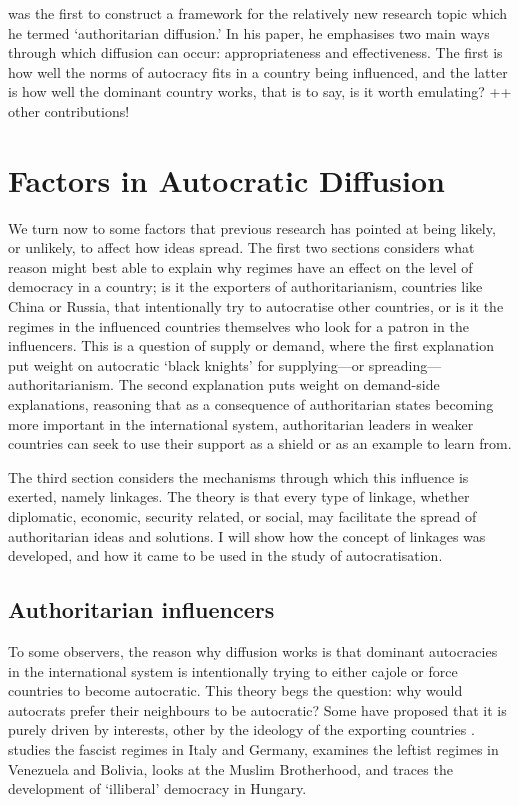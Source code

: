 \citet{ambrosio_constructing_2010} was the first to construct a framework for the relatively new research topic which he termed `authoritarian diffusion.' In his paper, he emphasises two main ways through which diffusion can occur: appropriateness and effectiveness. The first is how well the norms of autocracy fits in a country being influenced, and the latter is how well the dominant country works, that is to say, is it worth emulating? ++ other contributions!

\section{Factors in Autocratic Diffusion}
We turn now to some factors that previous research has pointed at being likely, or unlikely, to affect how ideas spread.  The first two sections considers what reason might best able to explain why regimes have an effect on the level of democracy in a country; is it the exporters of authoritarianism, countries like China or Russia, that intentionally try to autocratise other countries, or is it the regimes in the influenced countries themselves who look for a patron in the influencers. This is a question of supply or demand, where the first explanation put weight on autocratic `black knights' for supplying---or spreading---authoritarianism. The second explanation puts weight on demand-side explanations, reasoning that as a consequence of authoritarian states becoming more important in the international system, authoritarian leaders in weaker countries can seek to use their support as a shield or as an example to learn from. 

The third section considers the mechanisms through which this influence is exerted, namely linkages. The theory is that every type of linkage, whether diplomatic, economic, security related, or social, may facilitate the spread of authoritarian ideas and solutions. I will show how the concept of linkages was developed, and how it came to be used in the study of autocratisation. 

\subsection{Authoritarian influencers}
To some observers, the reason why diffusion works is that dominant autocracies in the international system is intentionally trying to either cajole or force countries to become autocratic. This theory begs the question: why would autocrats prefer their neighbours to be autocratic? Some have proposed that it is purely driven by interests, other by the ideology of the exporting countries \citep{weyland_autocratic_2017}.  \citet{weyland_fascisms_2017} studies the fascist regimes in Italy and Germany, \citet{de_la_torre_hugo_2017} examines the leftist regimes in Venezuela and Bolivia, \citet{darwich_creating_2017} looks at the Muslim Brotherhood, and \citet{buzogany_illiberal_2017} traces the development of `illiberal' democracy in Hungary. 

